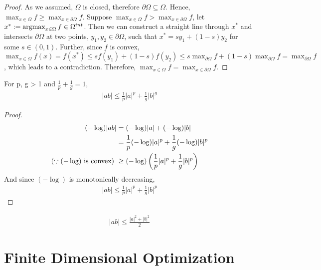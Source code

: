 \documentclass{article}
\begin{document}
    \begin{proof}
        As we assumed, $\Omega$ is closed, therefore $\partial \Omega \subseteq \Omega$. Hence, $\max_{x \in \Omega} f \geq \max_{x \in \partial \Omega} f$. Suppose $\max_{x \in \Omega} f > \max_{x \in \partial \Omega} f$, let $x^* := \operatorname*{argmax}_{x \in \Omega} f \in \Omega^{int}$. Then we can construct a straight line through $x^*$ and intersects $\partial \Omega$ at two points, $y_1, y_2 \in \partial \Omega$, such that $x^* = s y_1 + (1-s) y_2$ for some $s \in (0, 1)$. Further, since $f$ is convex, $\max_{x \in \Omega}f(x) = f(x^*) \leq s f(y_1) + (1-s) f(y_2) \leq s \max_{\partial \Omega} f + (1-s) \max_{\partial \Omega} f = \max_{\partial \Omega} f$, which leads to a contradiction. Therefore, $\max_{x \in \Omega} f = \max_{x \in \partial \Omega} f$.
    \end{proof}
    
    \begin{proposition}
    	For p, g > 1 and $\frac{1}{p} + \frac{1}{g} = 1$,
    	\begin{align}
    		|ab| \leq \frac{1}{p} |a|^p + \frac{1}{g}|b|^g
    	\end{align}
    \end{proposition}
    
    \begin{proof}
    	\begin{align}
    		(-\log) |ab| &= (-\log) |a| + (-\log) |b| \\
    		&= \frac{1}{p} (-\log) |a|^p + \frac{1}{g} (-\log) |b|^p \\
    		(\because (-\log) \text{{ is convex}})\ &\geq (-\log)\left( \frac{1}{p} |a|^p + \frac{1}{g} |b|^p \right)
    	\end{align}
    	And since $(-\log)$ is monotonically decreasing,
    	\begin{align}
    		|ab| \leq \frac{1}{p} |a|^p + \frac{1}{g} |b|^p
    	\end{align}
    \end{proof}
    
    \begin{corollary}
    	\begin{align}
    		|ab| \leq \frac{|a|^2 + |b|^2}{2}
    	\end{align}
    \end{corollary}
	
	\section{Finite Dimensional Optimization}
\end{document}
